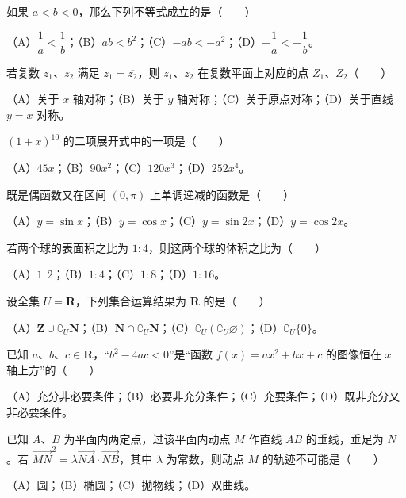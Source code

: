 \begin{question}
如果 $a<b<0$，那么下列不等式成立的是\mbox{（　　）}

（A）$\dfrac1a<\dfrac1b$；（B）$ab<b^2$；（C）$-ab<-a^2$；（D）$-\dfrac1a<-\dfrac1b$。

\end{question}
\begin{question}
若复数 $z_1$、$z_2$ 满足 $z_1=\overline{z_2}$，则 $z_1$、$z_2$ 在复数平面上对应的点 $Z_1$、$Z_2$\mbox{（　　）}

（A）关于 $x$ 轴对称；（B）关于 $y$ 轴对称；（C）关于原点对称；（D）关于直线 $y=x$ 对称。

\end{question}
\begin{question}
$(1+x)^{10}$ 的二项展开式中的一项是\mbox{（　　）}

（A）$45x$；（B）$90x^2$；（C）$120x^3$；（D）$252x^4$。

\end{question}
\begin{question}
既是偶函数又在区间 $(0,\pi)$ 上单调递减的函数是\mbox{（　　）}

（A）$y=\sin x$；（B）$y=\cos x$；（C）$y=\sin 2x$；（D）$y=\cos 2x$。

\end{question}
\begin{question}
若两个球的表面积之比为 $1:4$，则这两个球的体积之比为\mbox{（　　）}

（A）$1:2$；（B）$1:4$；（C）$1:8$；（D）$1:16$。

\end{question}
\begin{question}
设全集 $U=\mathbf R$，下列集合运算结果为 $\mathbf R$ 的是\mbox{（　　）}

（A）$\mathbf Z\cup\complement_U\mathbf N$；（B）$\mathbf N\cap\complement_U\mathbf N$；（C）$\complement_U(\complement_U\varnothing)$；（D）$\complement_U\{0\}$。

\end{question}
\begin{question}
已知 $a$、$b$、$c\in\mathbf R$，“$b^2-4ac<0$”是“函数 $f(x)=ax^2+bx+c$ 的图像恒在 $x$ 轴上方”的\mbox{（　　）}

（A）充分非必要条件；（B）必要非充分条件；（C）充要条件；（D）既非充分又非必要条件。

\end{question}
\begin{question}
已知 $A$、$B$ 为平面内两定点，过该平面内动点 $M$ 作直线 $AB$ 的垂线，垂足为 $N$。若 $\overrightarrow{MN}^2=\lambda\overrightarrow{NA}\cdot\overrightarrow{NB}$，其中 $\lambda$ 为常数，则动点 $M$ 的轨迹不可能是\mbox{（　　）}

（A）圆；（B）椭圆；（C）抛物线；（D）双曲线。

\end{question}

